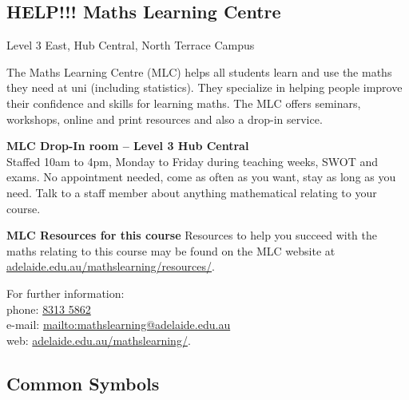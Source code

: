 \subsection{HELP!!! Maths Learning Centre}

Level 3 East, Hub Central, North Terrace Campus

The Maths Learning Centre (MLC) helps all students learn and use the maths they
need at uni (including statistics). They specialize in helping people improve
their confidence and skills for learning maths. The MLC offers seminars,
workshops, online and print resources and also a drop-in service.

{\bf MLC Drop-In room -- Level 3 Hub Central} \\
Staffed 10am to 4pm, Monday to Friday during teaching weeks, SWOT and exams. 
No appointment needed, come as often as you want, stay as long as you need.
Talk to a staff member about anything mathematical relating to your course.

{\bf MLC Resources for this course}
Resources to help you succeed with the maths relating to this course may be
found on the MLC website at
\url{adelaide.edu.au/mathslearning/resources/}.

For further information: \\
phone: \href{tel:+61-8-8313-5862}{8313 5862} \\
e-mail: \url{mailto:mathslearning@adelaide.edu.au} \\
web: \url{adelaide.edu.au/mathslearning/}.

\subsection{Common Symbols}

